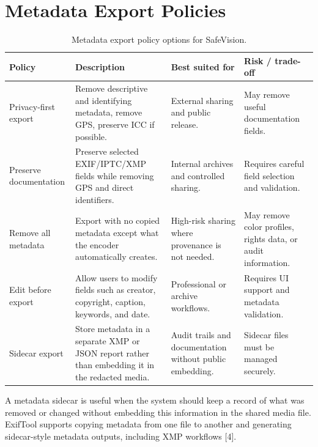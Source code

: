 \section{Metadata Export Policies}
\begin{table}[htbp]
\centering
\caption{Metadata export policy options for SafeVision.}
\label{tab:metadata-export-policies}
\small
\begin{tabularx}{\textwidth}{|>{\raggedright\arraybackslash}p{}|>{\raggedright\arraybackslash}X|>{\raggedright\arraybackslash}p{}|>{\raggedright\arraybackslash}p{}|}
\hline
\rowcolor{black!75}\color{white}\textbf{Policy} & \color{white}\textbf{Description} & \color{white}\textbf{Best suited for} & \color{white}\textbf{Risk / trade-off} \\
\hline
Privacy-first export & Remove descriptive and identifying metadata, remove GPS, preserve ICC if possible. & External sharing and public release. & May remove useful documentation fields. \\
\hline
Preserve documentation & Preserve selected EXIF/IPTC/XMP fields while removing GPS and direct identifiers. & Internal archives and controlled sharing. & Requires careful field selection and validation. \\
\hline
Remove all metadata & Export with no copied metadata except what the encoder automatically creates. & High-risk sharing where provenance is not needed. & May remove color profiles, rights data, or audit information. \\
\hline
Edit before export & Allow users to modify fields such as creator, copyright, caption, keywords, and date. & Professional or archive workflows. & Requires UI support and metadata validation. \\
\hline
Sidecar export & Store metadata in a separate XMP or JSON report rather than embedding it in the redacted media. & Audit trails and documentation without public embedding. & Sidecar files must be managed securely. \\
\hline
\end{tabularx}
\end{table}

A metadata sidecar is useful when the system should keep a record of what was removed or changed without embedding this information in the shared media file. ExifTool supports copying metadata from one file to another and generating sidecar-style metadata outputs, including XMP workflows [4].

